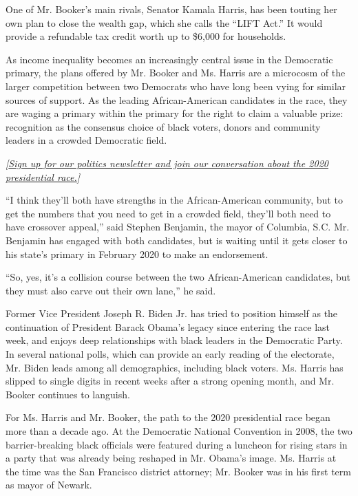 One of Mr. Booker's main rivals, Senator Kamala Harris, has been touting
her own plan to close the wealth gap, which she calls the ``LIFT Act.''
It would provide a refundable tax credit worth up to \$6,000 for
households.

As income inequality becomes an increasingly central issue in the
Democratic primary, the plans offered by Mr. Booker and Ms. Harris are a
microcosm of the larger competition between two Democrats who have long
been vying for similar sources of support. As the leading
African-American candidates in the race, they are waging a primary
within the primary for the right to claim a valuable prize: recognition
as the consensus choice of black voters, donors and community leaders in
a crowded Democratic field.

\emph{{[}}\href{https://www.nytimes.com/newsletters/politics?smid=rd\%3Faction\%3Dclick\&module=inline\&pgtype=Article}{\emph{Sign
up for our politics newsletter and join our conversation about the 2020
presidential race.}}\emph{{]}}

``I think they'll both have strengths in the African-American community,
but to get the numbers that you need to get in a crowded field, they'll
both need to have crossover appeal,'' said Stephen Benjamin, the mayor
of Columbia, S.C. Mr. Benjamin has engaged with both candidates, but is
waiting until it gets closer to his state's primary in February 2020 to
make an endorsement.

``So, yes, it's a collision course between the two African-American
candidates, but they must also carve out their own lane,'' he said.

Former Vice President Joseph R. Biden Jr. has tried to position himself
as the continuation of President Barack Obama's legacy since entering
the race last week, and enjoys deep relationships with black leaders in
the Democratic Party. In several national polls, which can provide an
early reading of the electorate, Mr. Biden leads among all demographics,
including black voters. Ms. Harris has slipped to single digits in
recent weeks after a strong opening month, and Mr. Booker continues to
languish.

For Ms. Harris and Mr. Booker, the path to the 2020 presidential race
began more than a decade ago. At the Democratic National Convention in
2008, the two barrier-breaking black officials were featured during a
luncheon for rising stars in a party that was already being reshaped in
Mr. Obama's image. Ms. Harris at the time was the San Francisco district
attorney; Mr. Booker was in his first term as mayor of Newark.

